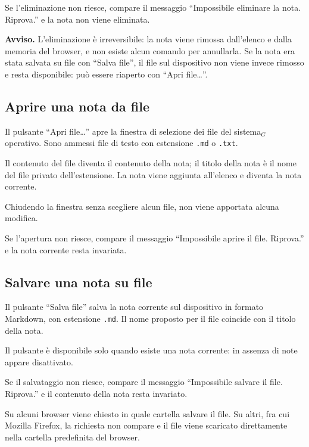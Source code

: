 \documentclass[a4paper, 10pt]{article}
\begin{document}
Se l'eliminazione non riesce, compare il messaggio ``Impossibile eliminare la nota. Riprova.'' e la nota non viene eliminata.

\vspace{0.5em}

\noindent
\textbf{Avviso.} L'eliminazione è irreversibile: la nota viene rimossa dall'elenco e dalla memoria del browser, e non esiste alcun comando per annullarla. Se la nota era stata salvata su file con ``Salva file'', il file sul dispositivo non viene invece rimosso e resta disponibile: può essere riaperto con ``Apri file\ldots''.

\subsection{Aprire una nota da file}
\label{sec:aprire-nota-file}
Il pulsante ``Apri file\ldots'' apre la finestra di selezione dei file del sistema$_G$ operativo. Sono ammessi file di testo con estensione \texttt{.md} o \texttt{.txt}.

Il contenuto del file diventa il contenuto della nota; il titolo della nota è il nome del file privato dell'estensione. La nota viene aggiunta all'elenco e diventa la nota corrente.

Chiudendo la finestra senza scegliere alcun file, non viene apportata alcuna modifica.

Se l'apertura non riesce, compare il messaggio ``Impossibile aprire il file. Riprova.'' e la nota corrente resta invariata.

\subsection{Salvare una nota su file}
\label{sec:salvare-nota-file}
Il pulsante ``Salva file'' salva la nota corrente sul dispositivo in formato Markdown, con estensione \texttt{.md}. Il nome proposto per il file coincide con il titolo della nota.

Il pulsante è disponibile solo quando esiste una nota corrente: in assenza di note appare disattivato.

Se il salvataggio non riesce, compare il messaggio ``Impossibile salvare il file. Riprova.'' e il contenuto della nota resta invariato.

Su alcuni browser viene chiesto in quale cartella salvare il file. Su altri, fra cui Mozilla Firefox, la richiesta non compare e il file viene scaricato direttamente nella cartella predefinita del browser.
\end{document}
